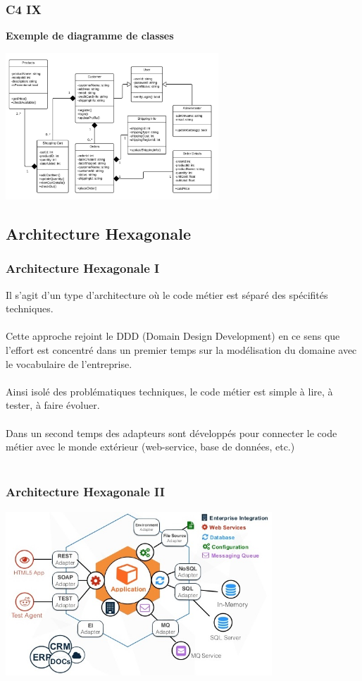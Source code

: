\begin{frame}
	\frametitle{C4 IX}

    \textbf{Exemple de diagramme de classes}\\
    \centerline{\includegraphics[width=8cm]{img/class_diagram.jpg}}
\end{frame}

\subsection{Architecture Hexagonale}
\begin{frame}
	\frametitle{Architecture Hexagonale I}

    Il s'agit d'un type d'architecture o\`u le code m\'etier est s\'epar\'e des sp\'ecifit\'es techniques.\\
	~\\
	Cette approche rejoint le DDD (Domain Design Development) en ce sens que l'effort est concentr\'e dans un premier temps sur la mod\'elisation du domaine avec le vocabulaire de l'entreprise.\\
	~\\
	Ainsi isol\'e des probl\'ematiques techniques, le code m\'etier est simple \`a lire, \`a tester, \`a faire \'evoluer.\\
	~\\
	Dans un second temps des adapteurs sont d\'evelopp\'es pour connecter le code m\'etier avec le monde ext\'erieur (web-service, base de donn\'ees, etc.)\\
	~\\
	\textbf{\color{red}{Le code m\'etier ne doit avoir aucune d\'ependance sur les adapteurs.}}
\end{frame}

\begin{frame}
	\frametitle{Architecture Hexagonale II}

    \centerline{\includegraphics[width=10cm]{img/hexagonal-architecture.jpg}}
\end{frame}

